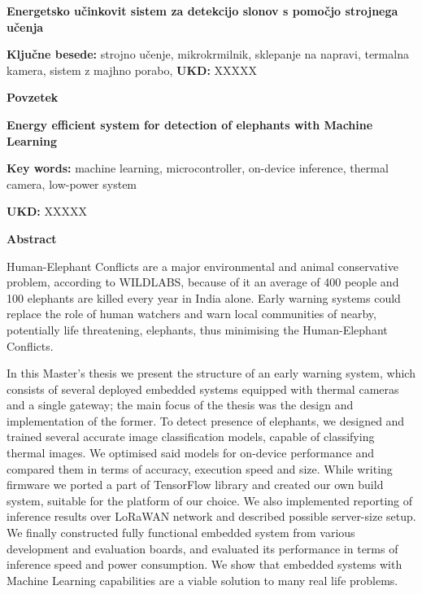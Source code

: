 \begin{poglavje}
\noindent\bfseries Energetsko učinkovit sistem za detekcijo slonov s pomočjo strojnega učenja
\end{poglavje}

\bigskip
\bigskip
\bigskip
\bigskip
\bigskip
\textbf{Ključne besede:} strojno učenje, mikrokrmilnik, sklepanje na napravi, termalna kamera, sistem z majhno porabo, 
\bigskip
\textbf{UKD:} XXXXX

\bigskip
\bigskip
\bigskip
\bigskip
\textbf{Povzetek}

\lipsum[1-5]
\newpage

\begin{poglavje}
\noindent\bfseries Energy efficient system for detection of elephants with Machine Learning
\end{poglavje}

\bigskip
\bigskip
\bigskip
\bigskip
\bigskip
\textbf{Key words:} machine learning, microcontroller, on-device inference, thermal camera, low-power system

\bigskip
\textbf{UKD:} XXXXX

\bigskip
\bigskip
\bigskip
\bigskip
\textbf{Abstract}

Human-Elephant Conflicts are a major environmental and animal conservative problem, according to WILDLABS, because of it an average of 400 people and 100 elephants are killed every year in India alone. 
Early warning systems could replace the role of human watchers and warn local communities of nearby, potentially life threatening, elephants, thus minimising the Human-Elephant Conflicts.

In this Master's thesis we present the structure of an early warning system, which consists of several deployed embedded systems equipped with thermal cameras and a single gateway; the main focus of the thesis was the design and implementation of the former.
To detect presence of elephants, we designed and trained several accurate image classification models, capable of classifying thermal images.
We optimised said models for on-device performance and compared them in terms of accuracy, execution speed and size.
While writing firmware we ported a part of TensorFlow library and created our own build system, suitable for the platform of our choice. 
We also implemented reporting of inference results over LoRaWAN network and described possible server-size setup.
We finally constructed fully functional embedded system from various development and evaluation boards, and evaluated its performance in terms of inference speed and power consumption.
We show that embedded systems with Machine Learning capabilities are a viable solution to many real life problems.
\newpage
